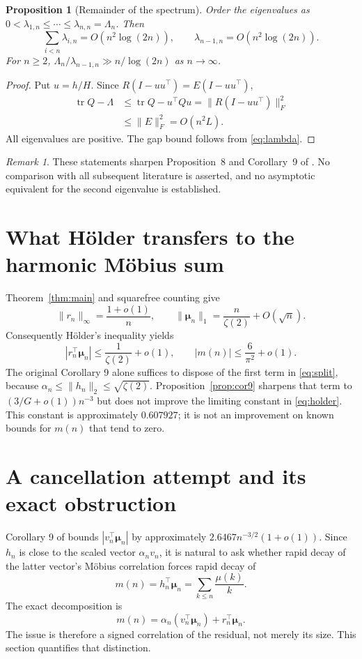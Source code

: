 \documentclass[11pt]{article}
\newtheorem{proposition}[theorem]{Proposition}
\theoremstyle{remark}\newtheorem{remark}[theorem]{Remark}
\newcommand{\muvec}{\boldsymbol\mu}
\newcommand{\tr}{\operatorname{tr}}
\begin{document}
\begin{proposition}[Remainder of the spectrum]\label{prop:spectrum}
Order the eigenvalues as $0<\lambda_{1,n}\le\cdots\le\lambda_{n,n}=\Lambda_n$. Then
\[
 \sum_{i<n}\lambda_{i,n}=O(n^2\log(2n)),\qquad
 \lambda_{n-1,n}=O(n^2\log(2n)).
\]
For $n\ge2$, $\Lambda_n/\lambda_{n-1,n}\gg n/\log(2n)$ as $n\to\infty$.
\end{proposition}
\begin{proof}
Put $u=h/H$. Since $R(I-uu^\top)=E(I-uu^\top)$,
\begin{align*}
 \tr Q-\Lambda&\le\tr Q-u^\top Qu
 =\|R(I-uu^\top)\|_F^2\\
 &\le\|E\|_F^2=O(n^2L).
\end{align*}
All eigenvalues are positive. The gap bound follows from \eqref{eq:lambda}.
\end{proof}
\begin{remark}
These statements sharpen Proposition~8 and Corollary~9 of \cite{kline}. No comparison with all subsequent literature is asserted, and no asymptotic equivalent for the second eigenvalue is established.
\end{remark}

\section{What H\"older transfers to the harmonic M\"obius sum}
Theorem~\ref{thm:main} and squarefree counting give
\[
 \|r_n\|_\infty=\frac{1+o(1)}n,\qquad
 \|\muvec_n\|_1=\frac n{\zeta(2)}+O(\sqrt n).
\]
Consequently H\"older's inequality yields
\begin{equation}\label{eq:holder}
 |r_n^\top\muvec_n|\le\frac1{\zeta(2)}+o(1),\qquad
 |m(n)|\le\frac6{\pi^2}+o(1).
\end{equation}
The original Corollary 9 alone suffices to dispose of the first term in \eqref{eq:split}, because $\alpha_n\le\|h_n\|_2\le\sqrt{\zeta(2)}$. Proposition~\ref{prop:cor9} sharpens that term to $(3/G+o(1))n^{-3}$ but does not improve the limiting constant in \eqref{eq:holder}. This constant is approximately $0.607927$; it is not an improvement on known bounds for $m(n)$ that tend to zero.

\section{A cancellation attempt and its exact obstruction}\label{sec:obstruction}
Corollary 9 of \cite{kline} bounds $|v_n^\top\muvec_n|$ by approximately $2.6467n^{-3/2}(1+o(1))$. Since $h_n$ is close to the scaled vector $\alpha_nv_n$, it is natural to ask whether rapid decay of the latter vector's M\"obius correlation forces rapid decay of
\[
 m(n)=h_n^\top\muvec_n=\sum_{k\le n}\frac{\mu(k)}k.
\]
The exact decomposition is
\begin{equation}\label{eq:split}
 m(n)=\alpha_n(v_n^\top\muvec_n)+r_n^\top\muvec_n.
\end{equation}
The issue is therefore a signed correlation of the residual, not merely its size. This section quantifies that distinction.
\end{document}
